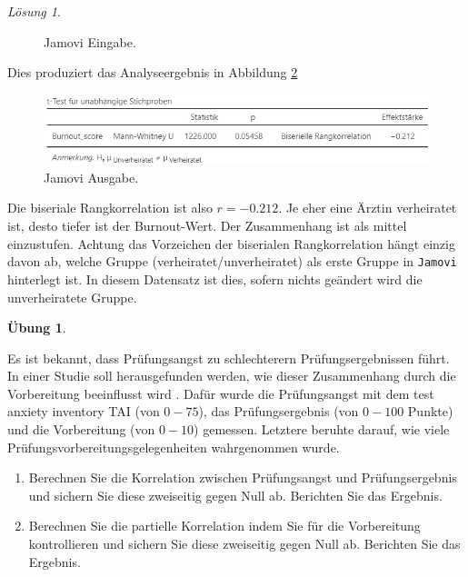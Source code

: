 \documentclass[
]{book}
\providecommand{\tightlist}{%
  \setlength{\itemsep}{0pt}\setlength{\parskip}{0pt}}
\theoremstyle{definition}
\theoremstyle{definition}
\theoremstyle{definition}
\newtheorem{exercise}{Übung}[chapter]
\theoremstyle{definition}
\theoremstyle{remark}
\newtheorem*{solution}{Lösung}
\begin{document}
\begin{solution}
\begin{figure}
{}

\caption{Jamovi Eingabe.}\label{fig:sol-ehe-burnout-rankcorrelation-input}
\end{figure}

Dies produziert das Analyseergebnis in Abbildung \ref{fig:sol-ehe-burnout-rankcorrelation-output}

\begin{figure}

{\centering \includegraphics{figures/08-exr-ehe-burnout-pointcorrelation-jmv-output3} 

}

\caption{Jamovi Ausgabe.}\label{fig:sol-ehe-burnout-rankcorrelation-output}
\end{figure}

Die biseriale Rangkorrelation ist also \(r = -0.212\). Je eher eine Ärztin verheiratet ist, desto tiefer ist der Burnout-Wert. Der Zusammenhang ist als mittel einzustufen. Achtung das Vorzeichen der biserialen Rangkorrelation hängt einzig davon ab, welche Gruppe (verheiratet/unverheiratet) als erste Gruppe in \texttt{Jamovi} hinterlegt ist. In diesem Datensatz ist dies, sofern nichts geändert wird die unverheiratete Gruppe.

\end{solution}

\begin{exercise}
\protect\hypertarget{exr:test-preparation}{}\label{exr:test-preparation}\leavevmode

Es ist bekannt, dass Prüfungsangst zu schlechterern Prüfungsergebnissen führt. In einer Studie soll herausgefunden werden, wie dieser Zusammenhang durch die Vorbereitung beeinflusst wird \citep{yusefzadeh2019}. Dafür wurde die Prüfungsangst mit dem test anxiety inventory TAI (von \(0-75\)), das Prüfungsergebnis (von \(0-100\) Punkte) und die Vorbereitung (von \(0-10\)) gemessen. Letztere beruhte darauf, wie viele Prüfungsvorbereitungsgelegenheiten wahrgenommen wurde.

\begin{enumerate}
\def\labelenumi{\alph{enumi})}
\tightlist
\item
  Berechnen Sie die Korrelation zwischen Prüfungsangst und Prüfungsergebnis und sichern Sie diese zweiseitig gegen Null ab. Berichten Sie das Ergebnis.
\item
  Berechnen Sie die partielle Korrelation indem Sie für die Vorbereitung kontrollieren und sichern Sie diese zweiseitig gegen Null ab. Berichten Sie das Ergebnis.
\end{enumerate}

\end{exercise}
\end{document}
